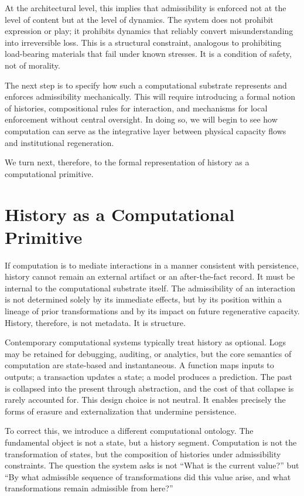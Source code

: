 \documentclass[12pt,oneside]{book}
\begin{document}
At the architectural level, this implies that admissibility is enforced not at the level of content but at the level of dynamics. The system does not prohibit expression or play; it prohibits dynamics that reliably convert misunderstanding into irreversible loss. This is a structural constraint, analogous to prohibiting load-bearing materials that fail under known stresses. It is a condition of safety, not of morality.

The next step is to specify how such a computational substrate represents and enforces admissibility mechanically. This will require introducing a formal notion of histories, compositional rules for interaction, and mechanisms for local enforcement without central oversight. In doing so, we will begin to see how computation can serve as the integrative layer between physical capacity flows and institutional regeneration.

We turn next, therefore, to the formal representation of history as a computational primitive.

\chapter{History as a Computational Primitive}

If computation is to mediate interactions in a manner consistent with persistence, history cannot remain an external artifact or an after-the-fact record. It must be internal to the computational substrate itself. The admissibility of an interaction is not determined solely by its immediate effects, but by its position within a lineage of prior transformations and by its impact on future regenerative capacity. History, therefore, is not metadata. It is structure.

Contemporary computational systems typically treat history as optional. Logs may be retained for debugging, auditing, or analytics, but the core semantics of computation are state-based and instantaneous. A function maps inputs to outputs; a transaction updates a state; a model produces a prediction. The past is collapsed into the present through abstraction, and the cost of that collapse is rarely accounted for. This design choice is not neutral. It enables precisely the forms of erasure and externalization that undermine persistence.

To correct this, we introduce a different computational ontology. The fundamental object is not a state, but a history segment. Computation is not the transformation of states, but the composition of histories under admissibility constraints. The question the system asks is not “What is the current value?” but “By what admissible sequence of transformations did this value arise, and what transformations remain admissible from here?”
\end{document}
